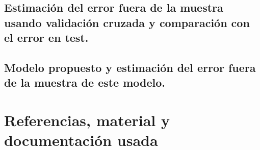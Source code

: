 \documentclass[12pt, spanish]{article}
\begin{document}
\subsection{Estimación del error fuera de la muestra usando validación cruzada y comparación con el error en test.}

\subsection{Modelo propuesto y estimación del error fuera de la muestra de este modelo.}


\newpage


\section{Referencias, material y documentación usada}
\end{document}
